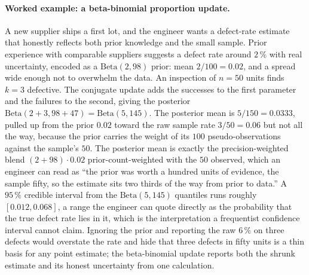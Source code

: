 \paragraph{Worked example: a beta-binomial proportion update.} A new
supplier ships a first lot, and the engineer wants a defect-rate
estimate that honestly reflects both prior knowledge and the small
sample. Prior experience with comparable suppliers suggests a defect
rate around $2\,\%$ with real uncertainty, encoded as a
$\mathrm{Beta}(2, 98)$ prior: mean $2/100 = 0.02$, and a spread wide
enough not to overwhelm the data. An inspection of $n = 50$ units finds
$k = 3$ defective. The conjugate update adds the successes to the first
parameter and the failures to the second, giving the posterior
$\mathrm{Beta}(2 + 3, 98 + 47) = \mathrm{Beta}(5, 145)$. The posterior
mean is $5/150 = 0.0333$, pulled up from the prior $0.02$ toward the raw
sample rate $3/50 = 0.06$ but not all the way, because the prior carries
the weight of its $100$ pseudo-observations against the sample's $50$.
The posterior mean is exactly the precision-weighted blend $(2 + 98)
\cdot 0.02$ prior-count-weighted with the $50$ observed, which an
engineer can read as ``the prior was worth a hundred units of evidence,
the sample fifty, so the estimate sits two thirds of the way from prior
to data.'' A $95\,\%$ credible interval from the $\mathrm{Beta}(5, 145)$
quantiles runs roughly $[0.012, 0.068]$, a range the engineer can quote
directly as the probability that the true defect rate lies in it, which
is the interpretation a frequentist confidence interval cannot claim.
Ignoring the prior and reporting the raw $6\,\%$ on three defects would
overstate the rate and hide that three defects in fifty units is a thin
basis for any point estimate; the beta-binomial update reports both the
shrunk estimate and its honest uncertainty from one calculation.

